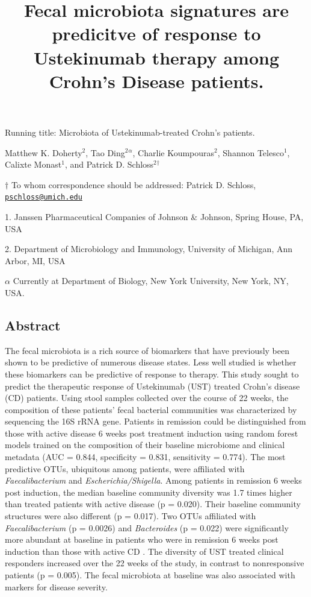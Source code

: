 \documentclass[12pt,]{article}
\title{Fecal microbiota signatures are predicitve of response to Ustekinumab
therapy among Crohn's Disease patients.}
\author{}
\date{}
\begin{document}
\maketitle

\vspace{35mm}

Running title: Microbiota of Ustekinumab-treated Crohn's patients.

\vspace{35mm} Matthew K. Doherty\({^2}\), Tao Ding\({^2}\)\({^\alpha}\),
Charlie Koumpouras\({^2}\), Shannon Telesco\({^1}\), Calixte
Monast\({^1}\), and Patrick D. Schloss\({^2}\)\({^\dagger}\)

\(\dagger\) To whom correspondence should be addressed: Patrick D.
Schloss,
\href{mailto:pschloss@umich.edu}{\nolinkurl{pschloss@umich.edu}}

1. Janssen Pharmaceutical Companies of Johnson \({\&}\) Johnson, Spring
House, PA, USA

2. Department of Microbiology and Immunology, University of Michigan,
Ann Arbor, MI, USA

\({\alpha}\) Currently at Department of Biology, New York University,
New York, NY, USA.

\newpage

\subsection{Abstract}\label{abstract}

The fecal microbiota is a rich source of biomarkers that have previously
been shown to be predictive of numerous disease states. Less well
studied is whether these biomarkers can be predictive of response to
therapy. This study sought to predict the therapeutic response of
Ustekinumab (UST) treated Crohn's disease (CD) patients. Using stool
samples collected over the course of 22 weeks, the composition of these
patients' fecal bacterial communities was characterized by sequencing
the 16S rRNA gene. Patients in remission could be distinguished from
those with active disease 6 weeks post treatment induction using random
forest models trained on the composition of their baseline microbiome
and clinical metadata (AUC = 0.844, specificity = 0.831, sensitivity =
0.774). The most predictive OTUs, ubiquitous among patients, were
affiliated with \emph{Faecalibacterium} and \emph{Escherichia/Shigella}.
Among patients in remission 6 weeks post induction, the median baseline
community diversity was 1.7 times higher than treated patients with
active disease (p = 0.020). Their baseline community structures were
also different (p = 0.017). Two OTUs affiliated with
\emph{Faecalibacterium} (p = 0.0026) and \emph{Bacteroides} (p = 0.022)
were significantly more abundant at baseline in patients who were in
remission 6 weeks post induction than those with active CD . The
diversity of UST treated clinical responders increased over the 22 weeks
of the study, in contrast to nonresponsive patients (p = 0.005). The
fecal microbiota at baseline was also associated with markers for
disease severity.
\end{document}
